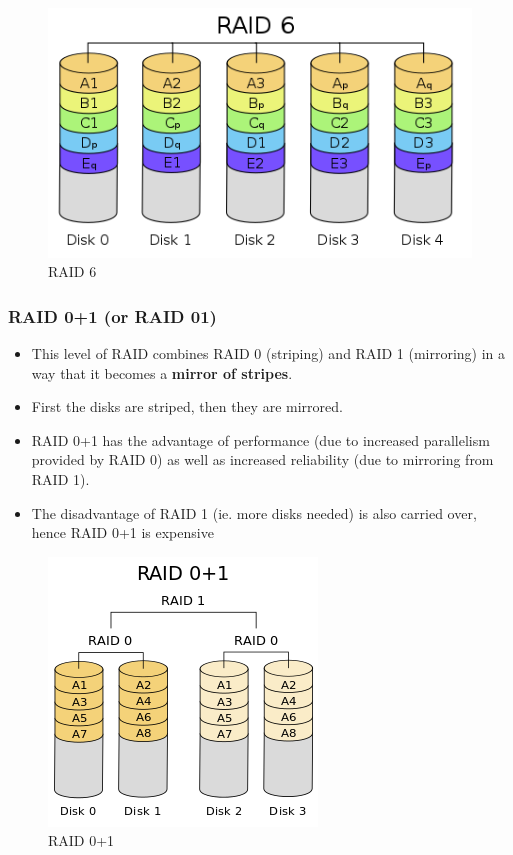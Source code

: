 \documentclass{article}
\theoremstyle{plain}
\theoremstyle{definition}
\begin{document}
\begin{figure}[!h]
    \centering
    \includegraphics[scale=0.45]{raid6.png}
    \caption{RAID 6}
    \label{fig:my_label_6}
\end{figure}

\subsubsection{RAID 0+1 (or RAID 01)}
\begin{itemize}
    \item This level of RAID combines RAID 0 (striping) and RAID 1 (mirroring) in a way that it becomes a \textbf{mirror of stripes}.
    
    \item First the disks are striped, then they are mirrored. 
    
    \item RAID 0+1 has the advantage of performance (due to increased parallelism provided by RAID 0) as well as increased reliability (due to mirroring from RAID 1).
    
    \item The disadvantage of RAID 1 (ie. more disks needed) is also carried over, hence RAID 0+1 is expensive
\end{itemize}

\begin{figure}[!h]
    \centering
    \includegraphics[scale=0.6]{raid01.png}
    \caption{RAID 0+1}
    \label{fig:my_label_7}
\end{figure}
\end{document}
